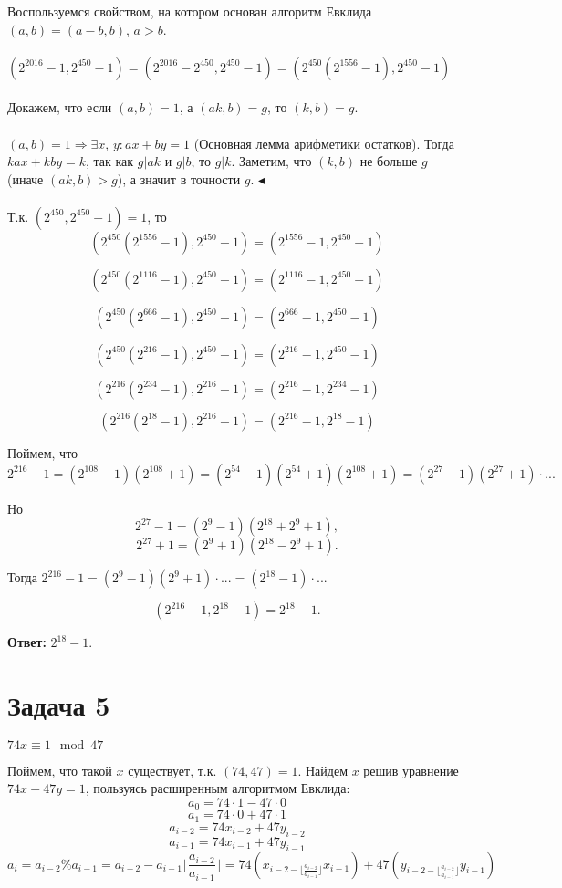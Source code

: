 \documentclass{article}
\begin{document}
	Воспользуемся свойством, на котором основан алгоритм Евклида $(a, b) = (a - b, b)$, $a > b$.
	\\
	\\
	$(2^{2016} - 1, 2^{450} - 1) = (2^{2016} - 2^{450}, 2^{450} - 1) = (2^{450}(2^{1556} - 1), 2^{450} - 1)$
	\\
	\\
	 Докажем, что если $(a, b) = 1$, а $(ak, b) = g$, то $(k, b) = g$.
	\\
	\\
	$(a, b) = 1 \Rightarrow \exists x$, $y: ax + by = 1 $	 (Основная лемма арифметики остатков).
	Тогда $kax + kby = k$, так как $g|ak$ и $g|b$, то $g|k$. Заметим, что $(k, b)$ не больше $g$ (иначе $(ak, b) > g$), а значит в точности $g$. $\blacktriangleleft$
	\\\\
	Т.к. $(2^{450}, 2^{450} - 1) = 1$, 
	то
	$$(2^{450}(2^{1556} - 1), 2^{450} - 1) = (2^{1556} - 1, 2^{450} - 1)$$
	
	
	$$(2^{450}(2^{1116} - 1), 2^{450} - 1) = (2^{1116} - 1, 2^{450} - 1)$$
	
	$$(2^{450}(2^{666} - 1), 2^{450} - 1) = (2^{666} - 1, 2^{450} - 1)$$
	
	$$(2^{450}(2^{216} - 1), 2^{450} - 1) = (2^{216} - 1, 2^{450} - 1)$$
	
	$$(2^{216}(2^{234} - 1), 2^{216} - 1) = (2^{216} - 1, 2^{234} - 1)$$
	
	$$(2^{216}(2^{18} - 1), 2^{216} - 1) = (2^{216} - 1, 2^{18} - 1)$$
	
	Поймем, что $2^{216} - 1 = (2^{108} - 1)(2^{108} + 1) = (2^{54} - 1)(2^{54} + 1)(2^{108} + 1) = (2^{27} - 1)(2^{27} + 1) \cdot ...$
	
	Но $$2^{27} - 1 = (2^9 - 1)(2^{18} + 2^9 + 1),$$ $$2^{27} + 1 = (2^9 + 1)(2^{18} - 2^9 + 1).$$ 
	
	Тогда $2^{216} - 1 = (2^9 - 1)(2^9 + 1) \cdot ... = (2^{18} - 1)\cdot ...$
	
	$$(2^{216} - 1, 2^{18} - 1) = 2^{18} - 1.$$
	
	\textbf{Ответ:} $2^{18} - 1.$
	
	\section{Задача 5}
	
	$74x \equiv 1 \mod 47$
	
	Поймем, что такой $x$ существует, т.к. $(74, 47) = 1$.
	Найдем $x$ решив уравнение $74x - 47y = 1$, пользуясь расширенным алгоритмом Евклида:
	$$a_0 = 74 \cdot 1 - 47 \cdot 0$$  
	$$a_1 = 74 \cdot 0 + 47 \cdot 1  $$ 
	$$a_{i - 2} = 74x_{i - 2} + 47y_{i - 2}$$ 
	$$a_{i - 1} = 74x_{i - 1} + 47y_{i - 1}$$ 
	$$a_i = a_{i - 2} \% a_{i - 1} = 
	a_{i - 2} - a_{i - 1}\lfloor\frac{a_{i-2}}{a_{i - 1}}\rfloor =
	74(x_{i - 2 - \lfloor\frac{a_{i-2}}{a_{i - 1}}\rfloor }x_{i - 1}) + 47(y_{i - 2 - \lfloor\frac{a_{i-2}}{a_{i - 1}}\rfloor }y_{i - 1})$$  
	
\end{document}
